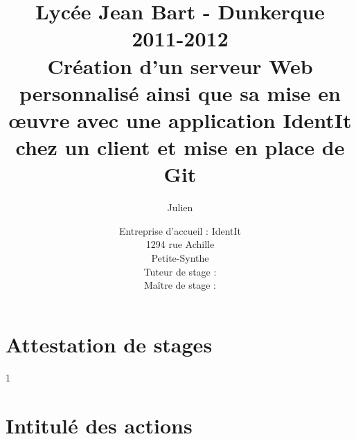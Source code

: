 \documentclass[12pt,a4paper]{report}
\title
{
	\normalsize{Lycée Jean Bart - Dunkerque\\
	2011-2012}\\
	\vspace{15mm}
  \LARGE{Création d'un serveur Web personnalisé ainsi que sa mise en
    \oe{}uvre avec une application IdentIt chez un client et mise en
    place de Git
    \vspace{15mm}}
}
\author{\bsc{Stechele} Julien\\
	\vspace{35mm}
}
\date{
	\normalsize{Entreprise d'accueil : IdentIt\\
    1294 rue Achille \bsc{Pérès}\\
	Petite-Synthe\\
	\vspace{5mm}
  Tuteur de stage : \bsc{M.~Anselin}\\
	Maître de stage : \bsc{M.~Dubourg}
	}
}%
\begin{document}

\maketitle



\renewcommand{\contentsname}{Sommaire}

{\setlength{\baselineskip}{2.3\baselineskip}\tableofcontents\par}











\appendix

\chapter{Attestation de stages} %
\label{cha:Attestations de stages}
1\iere{} \ieme{} \newpage

\chapter{Intitulé des actions} %
\label{cha:Intitulé des actions}
\end{document}
